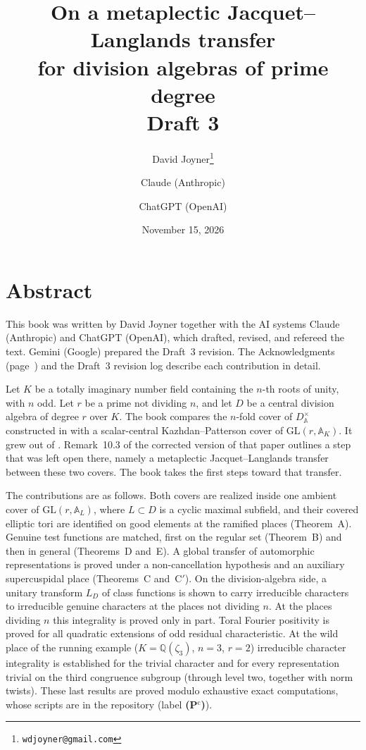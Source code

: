 \documentclass[12pt,letterpaper,oneside]{book}
\title{On a metaplectic Jacquet--Langlands transfer\\ for division algebras of prime degree\\[1em]
\large Draft 3}
\author{David Joyner\thanks{\texttt{wdjoyner@gmail.com}} \and Claude (Anthropic) \and ChatGPT (OpenAI)}
\date{November 15, 2026}
\theoremstyle{plain}
\theoremstyle{definition}
\newcommand{\Pctag}{\textnormal{\textbf{(P$^{\mathrm c}$)}}}
\begin{document}
\frontmatter
\maketitle
\tableofcontents

\chapter{Abstract}
This book was written by David Joyner together with the AI systems
Claude (Anthropic) and ChatGPT (OpenAI), which drafted, revised, and
refereed the text. Gemini (Google) prepared the Draft~3 revision. The
Acknowledgments
(page~\pageref{ch:ack}) and the Draft~3 revision log describe each
contribution in detail.

Let $K$ be a totally imaginary number field containing the $n$-th roots
of unity, with $n$ odd. Let $r$ be a prime not dividing $n$, and let $D$
be a central division algebra of degree $r$ over $K$. The book compares
the $n$-fold cover of $D^\times_{\mathbb A}$ constructed in \cite{JC26a}
with a scalar-central Kazhdan--Patterson cover of $\mathrm{GL}(r,\mathbb A_K)$.
It grew out of \cite{Jo88}. Remark~10.3 of the corrected version
\cite{JC26a} of that paper outlines a step that was left open there,
namely a metaplectic Jacquet--Langlands transfer between these two
covers. The book takes the first steps toward that transfer.

The contributions are as follows. Both covers are realized inside one
ambient cover of $\mathrm{GL}(r,\mathbb A_L)$, where $L\subset D$ is a
cyclic maximal subfield, and their covered elliptic tori are identified
on good elements at the ramified places (Theorem~A). Genuine test
functions are matched, first on the regular set (Theorem~B) and then in
general (Theorems~D and~E). A global transfer of automorphic
representations is proved under a non-cancellation hypothesis and an
auxiliary supercuspidal place (Theorems~C and~C$'$). On the
division-algebra side, a unitary transform $L_D$ of class functions is
shown to carry irreducible characters to irreducible genuine characters
at the places not dividing $n$. At the places dividing $n$ this
integrality is proved only in part. Toral Fourier positivity is proved
for all quadratic extensions of odd residual characteristic. At the wild
place of the running example ($K=\mathbb Q(\zeta_3)$, $n=3$, $r=2$)
irreducible character integrality is established for the trivial
character and for every representation trivial on the third congruence
subgroup (through level two, together with norm twists). These last
results are proved modulo exhaustive exact computations, whose scripts
are in the repository (label \Pctag).
\end{document}
